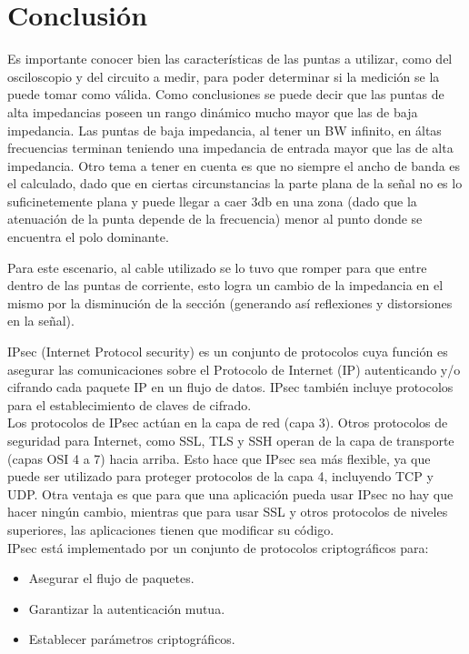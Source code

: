 \documentclass[a4paper,10pt]{article}
\begin{document}
	\section{Conclusi\'on}
		\indent Es importante conocer bien las características de las puntas a utilizar, como del osciloscopio y del circuito a medir, para poder determinar si la medición se la puede tomar como válida.
		\indent Como conclusiones se puede decir que las puntas de alta impedancias poseen un rango dinámico mucho mayor que las de baja impedancia. Las puntas de baja impedancia, al tener un BW infinito, en áltas frecuencias terminan teniendo una impedancia de entrada mayor que las de alta impedancia.
		\indent Otro tema a tener en cuenta es que no siempre el ancho de banda es el calculado, dado que en ciertas circunstancias la parte plana de la señal no es lo suficinetemente plana y puede llegar a caer 3db en una zona (dado que la atenuación de la punta depende de la frecuencia) menor al punto donde se encuentra el polo dominante.
		
		
		
		\indent Para este escenario, al cable utilizado se lo tuvo que romper para que entre dentro de las puntas de corriente, esto logra un cambio de la impedancia en el mismo por la disminución de la sección (generando así reflexiones y distorsiones en la señal).
		
		\indent IPsec (Internet Protocol security) es un conjunto de protocolos cuya función es asegurar las comunicaciones sobre el Protocolo de Internet (IP) autenticando y/o cifrando cada paquete IP en un flujo de datos. IPsec también incluye protocolos para el establecimiento de claves de cifrado.\\
	\indent Los protocolos de IPsec actúan en la capa de red (capa 3). Otros protocolos de seguridad para Internet, como SSL, TLS y SSH operan de la capa de transporte (capas OSI 4 a 7) hacia arriba. Esto hace que IPsec sea más flexible, ya que puede ser utilizado para proteger protocolos de la capa 4, incluyendo TCP y UDP. Otra ventaja es que para que una aplicación pueda usar IPsec no hay que hacer ningún cambio, mientras que para usar SSL y otros protocolos de niveles superiores, las aplicaciones tienen que modificar su código. \\
	\indent IPsec está implementado por un conjunto de protocolos criptográficos para:
	
	\begin{itemize}
		\item Asegurar el flujo de paquetes.
		\item Garantizar la autenticación mutua.
		\item Establecer parámetros criptográficos.
	\end{itemize}		
\end{document}
